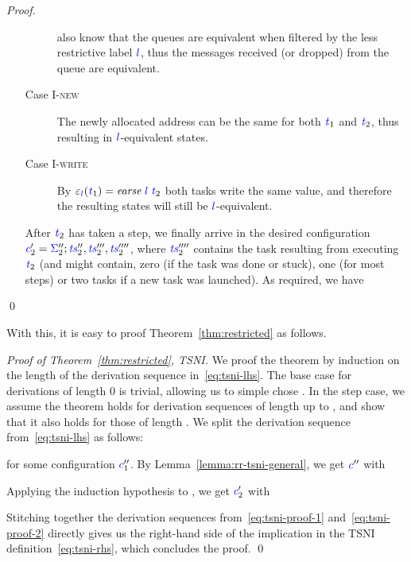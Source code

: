 \documentclass{llncs}
\newcommand{\Varid}[1]{\mathit{#1}}
\begin{document}
\begin{proof}
\begin{itemize}
\begin{description}
      also know that the queues are equivalent when filtered by the less
      restrictive label \ensuremath{\ifc{l}}, thus the messages received (or dropped) from the
      queue are equivalent.
      \item[Case \textsc{I-new}] The newly allocated address can be the same
      for both \ensuremath{\ifc{\Varid{t}}_{1}} and \ensuremath{\ifc{\Varid{t}}_{2}}, thus resulting in \ensuremath{\ifc{l}}-equivalent states.
      \item[Case \textsc{I-write}] By \ensuremath{\varepsilon_{\ifc{l}}(\ifc{\Varid{t}}_{1})\mathrel{=}\Varid{earse}\;\ifc{l}\;\ifc{\Varid{t}}_{2}} both tasks
      write the same value, and therefore the resulting states will still
      be \ensuremath{\ifc{l}}-equivalent.
    \end{description}
    After \ensuremath{\ifc{\Varid{t}}_{2}} has taken a step, we finally arrive in the desired
    configuration \ensuremath{\ifc{c}_{2}'\mathrel{=}\ifc{\Sigma}_{2}'';\ifc{\Varid{ts}}_{2}'',\ifc{\Varid{ts}}_{2}''',\ifc{\Varid{ts}}_{2}''''}, where
    \ensuremath{\ifc{\Varid{ts}}_{2}''''} contains the task resulting from executing \ensuremath{\ifc{\Varid{t}}_{2}} (and
    might contain, zero (if the task was done or stuck), one (for most steps) or two tasks if a new task was launched).
    As required, we have
    
  \end{itemize}
  \qed
\end{proof}
With this, it is easy to proof Theorem~\ref{thm:restricted} as follows.
\begin{proof}[Proof of Theorem~\ref{thm:restricted}, TSNI]
We proof the theorem by induction on the length of the derivation sequence in~\eqref{eq:tsni-lhs}.
  The base case for derivations
  of length 0 is trivial, allowing
  us to simple chose .  In the step case, we assume
  the theorem holds for derivation sequences of length up to , and show that it also
  holds for those of length .  We split the derivation sequence from~\eqref{eq:tsni-lhs} as follows:
  
  for some configuration \ensuremath{\ifc{c}_{1}''}.  By Lemma~\ref{lemma:rr-tsni-general}, we get
  \ensuremath{\ifc{c}''} with
  
  Applying the induction hypothesis to
  , we get \ensuremath{\ifc{c}_{2}'} with
  
  Stitching together the derivation sequences from~\eqref{eq:tsni-proof-1} and~\eqref{eq:tsni-proof-2} directly gives
  us the right-hand side of the implication in the TSNI
  definition~\eqref{eq:tsni-rhs}, which concludes the proof.
  \qed
\end{proof}








\fi
\end{document}
